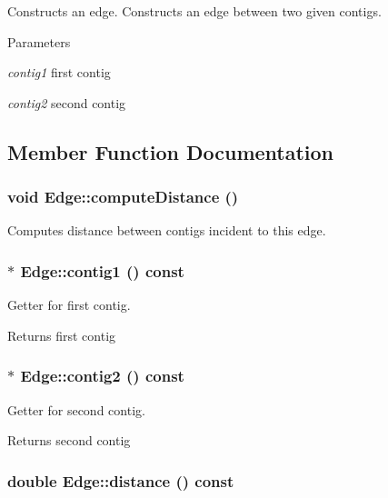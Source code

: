 Constructs an edge. Constructs an edge between two given contigs.


\begin{DoxyParams}{Parameters}
\item[{\em contig1}]first contig \item[{\em contig2}]second contig \end{DoxyParams}


\subsection{Member Function Documentation}
\hypertarget{classEdge_a271ab16896c1691751940810b823d2bc}{
\subsubsection[{computeDistance}]{\setlength{\rightskip}{0pt plus 5cm}void Edge::computeDistance ()}}
\label{classEdge_a271ab16896c1691751940810b823d2bc}


Computes distance between contigs incident to this edge. \hypertarget{classEdge_a30961b15102ee33f9fd67001602a7296}{
\subsubsection[{contig1}]{ $\ast$ Edge::contig1 () const}}
\label{classEdge_a30961b15102ee33f9fd67001602a7296}


Getter for first contig. \begin{DoxyReturn}{Returns}
first contig 
\end{DoxyReturn}
\hypertarget{classEdge_afc2ab7144ce4fcf9b6ec54ec63b034fe}{
\subsubsection[{contig2}]{ $\ast$ Edge::contig2 () const}}
\label{classEdge_afc2ab7144ce4fcf9b6ec54ec63b034fe}


Getter for second contig. \begin{DoxyReturn}{Returns}
second contig 
\end{DoxyReturn}
\hypertarget{classEdge_a8f7680604c7fb101504f479be01d9c12}{
\subsubsection[{distance}]{\setlength{\rightskip}{0pt plus 5cm}double Edge::distance () const}}
\label{classEdge_a8f7680604c7fb101504f479be01d9c12}


